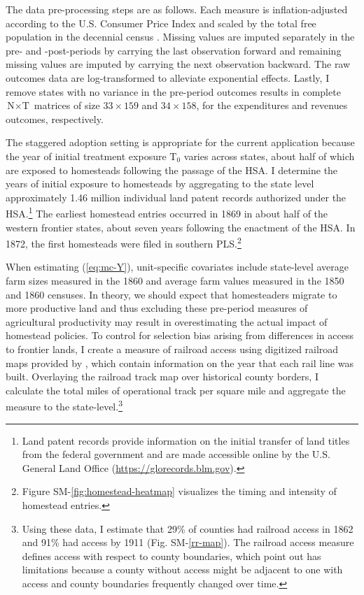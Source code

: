 \documentclass[hidelinks,12pt]{article}
\begin{document}
The data pre-processing steps are as follows. Each measure is inflation-adjusted according to the U.S. Consumer Price Index \citep{williamson2017seven} and scaled by the total free population in the decennial census \citep{haines2010}. Missing values are imputed separately in the pre- and -post-periods by carrying the last observation forward and remaining missing values are imputed by carrying the next observation backward. The raw outcomes data are log-transformed to alleviate exponential effects. Lastly, I remove states with no variance in the pre-period outcomes results in complete $\text{N} \times \text{T}$ matrices of size $33 \times 159$ and $34 \times 158$, for the expenditures and revenues outcomes, respectively. 

The staggered adoption setting is appropriate for the current application because the year of initial treatment exposure $\text{T}_0$ varies across states, about half of which are exposed to homesteads following the passage of the HSA. I determine the years of initial exposure to homesteads by aggregating to the state level approximately 1.46 million individual land patent records authorized under the HSA.\footnote{Land patent records provide information on the initial transfer of land titles from the federal government and are made accessible online by the U.S. General Land Office (\url{https://glorecords.blm.gov}).} The earliest homestead entries occurred in 1869 in about half of the western frontier states, about seven years following the enactment of the HSA. In 1872, the first homesteads were filed in southern PLS.\footnote{Figure SM-\ref{fig:homestead-heatmap} visualizes the timing and intensity of homestead entries.} 

When estimating (\ref{eq:mc-Y}), unit-specific covariates include state-level average farm sizes measured in the 1860 and average farm values measured in the 1850 and 1860 censuses. In theory, we should expect that homesteaders migrate to more productive land and thus excluding these pre-period measures of agricultural productivity may result in overestimating the actual impact of homestead policies. To control for selection bias arising from differences in access to frontier lands, I create a measure of railroad access using digitized railroad maps provided by \citet{atack2013use}, which contain information on the year that each rail line was built. Overlaying the railroad track map over historical county borders, I calculate the total miles of operational track per square mile and aggregate the measure to the state-level.\footnote{Using these data, I estimate that 29\% of counties had railroad access in 1862 and 91\% had access by 1911 (Fig. SM-\ref{rr-map}). The railroad access measure defines access with respect to county boundaries, which \citet{atack2012impact} point out has limitations because a county without access might be adjacent to one with access and county boundaries frequently changed over time.}
\end{document}
